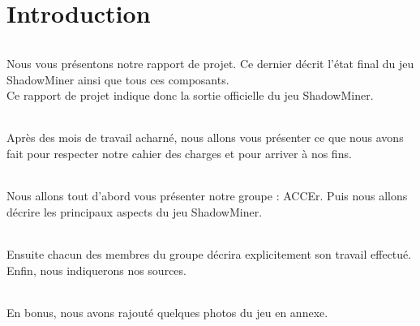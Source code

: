 \documentclass[titlepage, 13px, a4paper]{report}
\begin{document}
\AddToShipoutPicture*{\BackgroundPic}

\maketitle
\tableofcontents


\part{Introduction} 
\paragraph*{} \hspace{0pt}
Nous vous présentons notre rapport de projet. Ce dernier décrit l’état final du jeu ShadowMiner 
ainsi que tous ces composants. \\
Ce rapport de projet indique donc la sortie officielle du jeu ShadowMiner. \\

\paragraph*{} \hspace{0pt}
Après des mois de travail acharné, nous allons vous présenter ce que nous avons fait pour respecter 
notre cahier des charges et pour arriver à nos fins. \\

\paragraph*{} \hspace{0pt}
Nous allons tout d’abord vous présenter notre groupe : ACCEr. Puis nous allons décrire les 
principaux aspects du jeu ShadowMiner. \\

\paragraph*{} \hspace{0pt}
Ensuite chacun des membres du groupe décrira explicitement son travail effectué. \\
Enfin, nous indiquerons nos sources. \\

\paragraph*{} \hspace{0pt}
En bonus, nous avons rajouté quelques photos du jeu en annexe. \\
\end{document}
